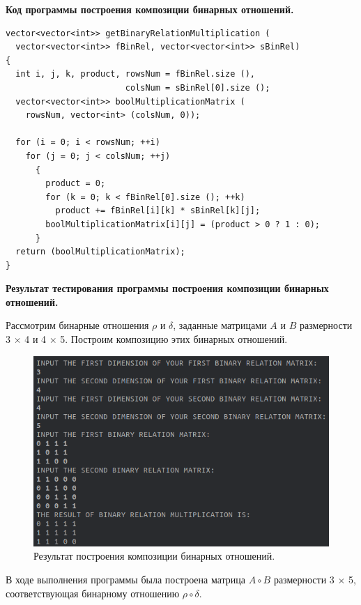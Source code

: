 \documentclass[spec, och, otchet, hidelinks]{SCWorks}
\newcommand{\tbf}[1]{\textbf{#1}}
\begin{document}
\par \tbf{Код программы построения композиции бинарных отношений.}
\begin{lstlisting}[caption=Код программы., mathescape]
vector<vector<int>> getBinaryRelationMultiplication (
  vector<vector<int>> fBinRel, vector<vector<int>> sBinRel)
{
  int i, j, k, product, rowsNum = fBinRel.size (), 
                        colsNum = sBinRel[0].size ();
  vector<vector<int>> boolMultiplicationMatrix (
    rowsNum, vector<int> (colsNum, 0));

  for (i = 0; i < rowsNum; ++i)
    for (j = 0; j < colsNum; ++j)
      {
        product = 0;
        for (k = 0; k < fBinRel[0].size (); ++k)
          product += fBinRel[i][k] * sBinRel[k][j];
        boolMultiplicationMatrix[i][j] = (product > 0 ? 1 : 0);
      }
  return (boolMultiplicationMatrix);
}
\end{lstlisting}

\par \tbf{Результат тестирования программы построения композиции бинарных
  отношений.}
\par Рассмотрим бинарные отношения $\rho$ и $\delta$, заданные матрицами $A$ и
$B$ размерности 3 $\times$ 4 и 4 $\times$ 5. Построим композицию этих бинарных
отношений.

\begin{figure}[h]
  \center\includegraphics[scale=0.7]{binary_relation_composition.png}
  \caption{Результат построения композиции бинарных отношений.}
\end{figure}

\par В ходе выполнения программы была построена матрица $A \circ B$ размерности
3 $\times$ 5, соответствующая бинарному отношению $\rho \circ \delta$.
\end{document}
